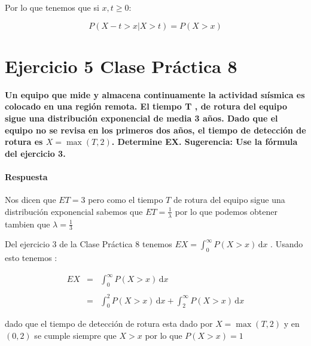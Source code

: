 \documentclass{article}
\begin{document}
\begin{flushleft}
        Por lo que tenemos que si $ x,t \ge 0 $: 

        \begin{equation*}
            P \left(X-t > x \vert  X > t\right) = P \left( X > x \right) 
        \end{equation*}

        
            
    \end{flushleft}




    \section*{Ejercicio 5 Clase Pr\'actica 8} 


    \begin{flushleft}
        {\bf Un equipo que mide y almacena continuamente la actividad sı\'ismica es colocado
        en una regi\'on remota. El tiempo T , de rotura del equipo sigue una distribuci\'on
        exponencial de media 3 años. Dado que el equipo no se revisa en los primeros
        dos años, el tiempo de detección de rotura es $X = \max (T, 2)$. Determine EX.
        Sugerencia: Use la f\'ormula del ejercicio 3. }

        \paragraph{Respuesta}
        Nos dicen que $ET = 3$ pero como el tiempo $T$ de rotura del equipo sigue una
        distribuci\'on exponencial sabemos que $ET = \frac{1}{\lambda}$  por lo que podemos 
        obtener tambien que $\lambda = \frac{1}{3}$
        
        Del ejercicio 3 de la Clase Pr\'actica 8 tenemos $EX = \int_{0}^{\infty} P\left(X > x\right) \,\mathrm{d}x $ . Usando esto tenemos : 

        \begin{equation*}
            \begin{array}{rcl}
                EX  & = &   \int_{0}^{\infty} P \left(X > x \right) \,\mathrm{d}x 
                \\\\
                    & = &  \int_{0}^{2} P \left(X > x \right) \,\mathrm{d}x + \int_{2}^{\infty} P \left(X >x \right) \,\mathrm{d}x   
            \end{array}
        \end{equation*}

        dado que el tiempo de detecci\'on de rotura esta dado por $X = \max\left(T,2\right)$ y en $\left(0,2\right)$ se cumple siempre que $X>x$
        por lo que $P\left(X>x\right) = 1 $ 


\end{flushleft}
\end{document}
